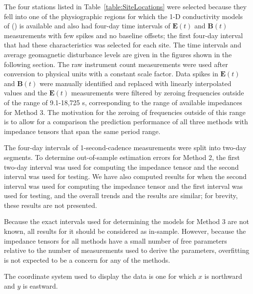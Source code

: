 \documentclass[linenumbers,draft]{agujournal}
\begin{document}
The four stations listed in Table~\ref{table:SiteLocations} were selected because they fell into one of the physiographic regions for which the 1-D conductivity models of (\cite{Fernberg2012}) is available and also had four-day time intervals of $\mathbf{E}(t)$ and $\mathbf{B}(t)$ measurements with few spikes and no baseline offsets; the first four-day interval that had these characteristics was selected for each site.  The time intervals and average geomagnetic disturbance levels are given in the figures shown in the following section.  The raw instrument count measurements were used after conversion to physical units with a constant scale factor.  Data spikes in $\mathbf{E}(t)$ and $\mathbf{B}(t)$ were manually identified and replaced with linearly interpolated values and the $\mathbf{E}(t)$ measurements were filtered by zeroing frequencies outside of the range of 9.1-18,725 s, corresponding to the range of available impedances for Method 3.  The motivation for the zeroing of frequencies outside of this range is to allow for a comparison the prediction performance of all three methods with impedance tensors that span the same period range.


The four-day intervals of 1-second-cadence measurements were split into two-day segments.  To determine out-of-sample estimation errors for Method 2, the first two-day interval was used for computing the impedance tensor and the second interval was used for testing. We have also computed results for when the second interval was used for computing the impedance tensor and the first interval was used for testing, and the overall trends and the results are similar; for brevity, these results are not presented.

Because the exact intervals used for determining the models for Method 3 are not known, all results for it should be considered as in-sample. However, because the impedance tensors for all methods have a small number of free parameters relative to the number of measurements used to derive the parameters, overfitting is not expected to be a concern for any of the methods.

The coordinate system used to display the data is one for which $x$ is northward and $y$ is eastward.
\end{document}
